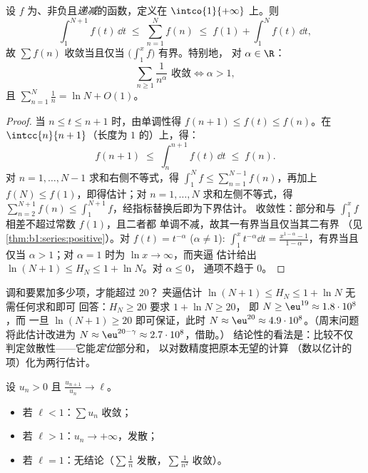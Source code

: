 \begin{theorem}\label{thm:b1:series:riemann}
设 $f$ 为、非负且\emph{递减}的函数，定义在
$\intco{1}{+\infty}$ 上。则
\[
\int_1^{N+1} f(t)\,\dd t \;\leq\; \sum_{n=1}^{N} f(n) \;\leq\; f(1)
+ \int_1^{N} f(t)\,\dd t ,
\]
故 $\sum f(n)$ 收敛当且仅当 $\bigl(\int_1^x f\bigr)$ 有界。特别地，
对 $\alpha \in \R$：
\[
\sum_{n \geq 1} \frac{1}{n^\alpha} \text{ 收敛}
\iff \alpha > 1,
\]
且 $\sum_{n=1}^{N} \frac1n = \ln N + O(1)$。
\end{theorem}

\begin{proof}
当 $n \leq t \leq n+1$ 时，由单调性得 $f(n+1) \leq f(t)
\leq f(n)$。在 $\intcc{n}{n+1}$（长度为
$1$ 的）上，得：
\[
f(n+1) \;\leq\; \int_n^{n+1} f(t)\,\dd t \;\leq\; f(n) .
\]
对 $n = 1, \dots, N-1$ 求和右侧不等式，得
$\int_1^{N} f \leq \sum_{n=1}^{N-1} f(n)$，再加上
$f(N) \leq f(1)$，即得估计；对
$n = 1, \dots, N$ 求和左侧不等式，得 $\sum_{n=2}^{N+1} f(n) \leq
\int_1^{N+1} f$，经指标替换后即为下界估计。
收敛性：部分和与 $\int_1^x f$
相差不超过常数 $f(1)$，且二者都
单调不减，故其一有界当且仅当其二有界
（见\cref{thm:b1:series:positive}）。对 $f(t)
= t^{-\alpha}$ ($\alpha \neq 1$): $\int_1^x t^{-\alpha}\dd t =
\frac{x^{1-\alpha} - 1}{1 - \alpha}$，有界当且仅当 $\alpha > 1$；对
$\alpha = 1$ 时为 $\ln x \to \infty$，而夹逼
估计给出 $\ln(N+1) \leq H_N \leq 1 + \ln N$。对 $\alpha \leq 0$，
通项不趋于 $0$。
\end{proof}

\begin{example}[调和级数的累加]\label{ex:b1:series:harmonicstack}
调和要累加多少项，才能超过 $20$？
夹逼估计 $\ln(N+1) \leq H_N \leq 1 + \ln N$ 无需任何求和即可
回答：$H_N \geq 20$ 要求 $1 + \ln N \geq 20$，
即 $N \geq \eu^{19} \approx 1.8\cdot10^{8}$，而
一旦 $\ln(N + 1) \geq 20$ 即可保证，此时 $N \approx \eu^{20} \approx
4.9\cdot10^{8}$。（周末问题将此估计改进为 $N \approx
\eu^{20 - \gamma} \approx 2.7\cdot10^{8}$，借助。）
结论性的看法是：比较不仅
判定敛散性——它能\emph{定位}部分和，
以对数精度把原本无望的计算
（数以亿计的项）化为两行估计。
\end{example}

\begin{theorem}\label{thm:b1:series:ratio}
设 $u_n > 0$ 且 $\frac{u_{n+1}}{u_n} \to \ell$。
\begin{itemize}
  \item 若 $\ell < 1$：$\sum u_n$ 收敛；
  \item 若 $\ell > 1$：$u_n \to +\infty$，发散；
  \item 若 $\ell = 1$：无结论（$\sum \frac1n$ 发散，$\sum
        \frac{1}{n^2}$ 收敛）。
\end{itemize}
\end{theorem}

